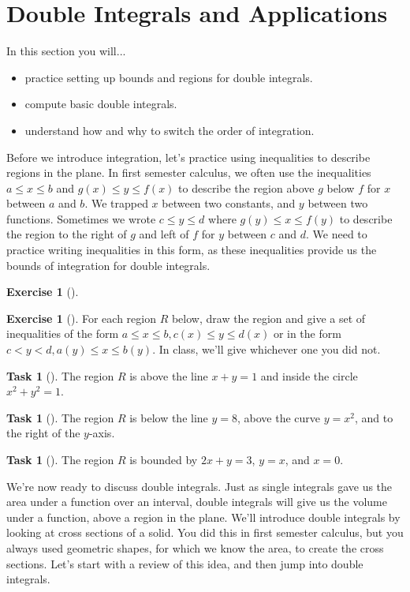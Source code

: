 \documentclass[10pt,]{book}
\theoremstyle{plain}
\theoremstyle{definition}
\theoremstyle{definition}
\theoremstyle{definition}
\theoremstyle{definition}
\newtheorem{exploration}[project]{Exercise}
\newtheorem{task}[project]{Task}
\theoremstyle{definition}
\numberwithin{equation}{section}
\newcommand{\lt}{<}
\begin{document}
\section[{Double Integrals and Applications}]{Double Integrals and Applications}\label{section-37}
In this section you will... \leavevmode%
\begin{itemize}[label=\textbullet]
\item{}practice setting up bounds and regions for double integrals.%
\item{}compute basic double integrals.%
\item{}understand how and why to switch the order of integration.%
\end{itemize}
%
\par
Before we introduce integration, let's practice using inequalities to describe regions in the plane. In first semester calculus, we often use the inequalities \(a\leq x\leq b\) and \(g(x)\leq y\leq f(x)\) to describe the region above \(g\) below \(f\) for \(x\) between \(a\) and \(b\). We trapped \(x\) between two constants, and \(y\) between two functions. Sometimes we wrote \(c\leq y\leq d\) where \(g(y)\leq x\leq f(y)\) to describe the region to the right of \(g\) and left of \(f\) for \(y\) between \(c\) and \(d\). We need to practice writing inequalities in this form, as these inequalities provide us the bounds of integration for double integrals.%
\begin{exploration}[]\label{exploration-246}
\end{exploration}
\begin{exploration}[]\label{exploration-247}
For each region \(R\) below, draw the region and give a set of inequalities of the form \(a\leq x\leq b, c(x)\leq y\leq d(x)\) or in the form \(c\lt y\lt d, a(y)\leq x\leq b(y)\). In class, we'll give whichever one you did not.%
\begin{task}[]\label{task-663}
The region \(R\) is above the line \(x+y=1\) and inside the circle \(x^2+y^2=1\).%
\end{task}
\begin{task}[]\label{task-664}
The region \(R\) is below the line \(y=8\), above the curve \(y=x^2\), and to the right of the \(y\)-axis.%
\end{task}
\begin{task}[]\label{task-665}
The region \(R\) is bounded by \(2x+y=3\), \(y=x\), and \(x=0\).%
\end{task}
\end{exploration}
We're now ready to discuss double integrals. Just as single integrals gave us the area under a function over an interval, double integrals will give us the volume under a function, above a region in the plane. We'll introduce double integrals by looking at cross sections of a solid. You did this in first semester calculus, but you always used geometric shapes, for which we know the area, to create the cross sections. Let's start with a review of this idea, and then jump into double integrals.%
\end{document}

